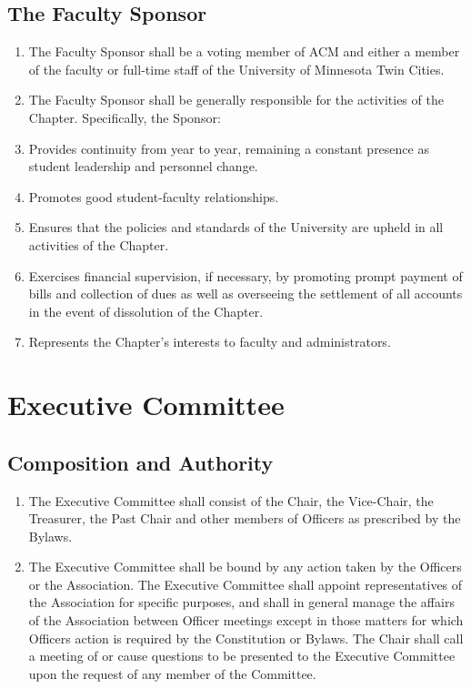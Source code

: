\subsection{The Faculty Sponsor}
\begin{enumerate}
	\item The Faculty Sponsor shall be a voting member of ACM and either a member of the faculty or full-time staff of the University of Minnesota Twin Cities.
	\item The Faculty Sponsor shall be generally responsible for the activities of the Chapter. Specifically, the Sponsor:
	\item Provides continuity from year to year, remaining a constant presence as student leadership and personnel change.
	\item Promotes good student-faculty relationships.
	\item Ensures that the policies and standards of the University are upheld in all activities of the Chapter.
	\item Exercises financial supervision, if necessary, by promoting prompt payment of bills and collection of dues as well as overseeing the settlement of all accounts in the event of dissolution of the Chapter.
	\item Represents the Chapter’s interests to faculty and administrators.
\end{enumerate}

\section{Executive Committee}

\subsection{Composition and Authority}
\begin{enumerate}
	\item The Executive Committee shall consist of the Chair, the Vice-Chair, the Treasurer, the Past Chair and other members of Officers as prescribed by the Bylaws.
	\item The Executive Committee shall be bound by any action taken by the Officers or the Association. The Executive Committee shall appoint representatives of the Association for specific purposes, and shall in general manage the affairs of the Association between Officer meetings except in those matters for which Officers action is required by the Constitution or Bylaws. The Chair shall call a meeting of or cause questions to be presented to the Executive Committee upon the request of any member of the Committee.
\end{enumerate}

